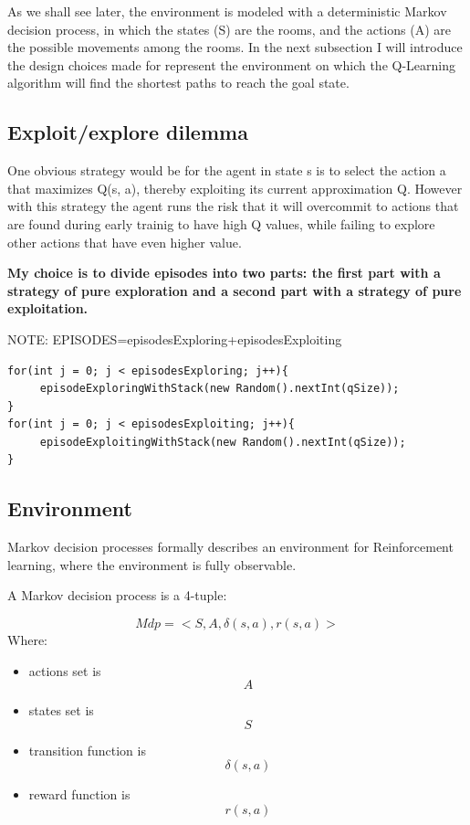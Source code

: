\documentclass[a4paper]{article}
\begin{document}
As we shall see later, the environment is modeled with a deterministic Markov decision process, in which the states (S) are the rooms, and the actions (A) are the possible movements among the rooms.
In the next subsection I will introduce the design choices made for represent the environment on which the Q-Learning algorithm will find the shortest paths to reach the goal state.

\subsection{Exploit/explore dilemma}
One obvious strategy would be for the agent in state s is to select the action a that maximizes Q(s, a), thereby exploiting its current approximation Q. However with this strategy the agent runs the risk that it will overcommit to actions that are found during early trainig to have high Q values, while failing to explore other actions that have even higher value.

\textbf{My choice is to divide episodes into two parts: the first part with a strategy of pure exploration and a second part with a strategy of pure exploitation.}

NOTE: EPISODES=episodesExploring+episodesExploiting

\begin{lstlisting}[caption={Java code}]
for(int j = 0; j < episodesExploring; j++){
     episodeExploringWithStack(new Random().nextInt(qSize));
}
for(int j = 0; j < episodesExploiting; j++){
     episodeExploitingWithStack(new Random().nextInt(qSize));
}
\end{lstlisting}


\subsection{Environment}
Markov decision processes formally describes an environment for Reinforcement learning, where the environment is fully observable.

A Markov decision process is a 4-tuple:

\begin{equation}
Mdp=<S, A, \delta(s,a), r(s,a)>
\end{equation}
Where:
\begin{itemize}
  \item actions set is \begin{displaymath} A \end{displaymath}
  \item states set is \begin{displaymath} S \end{displaymath}
  \item transition function is \begin{displaymath} \delta(s,a) \end{displaymath}
  \item reward function is \begin{displaymath} r(s,a) \end{displaymath}
\end{itemize}
\end{document}
